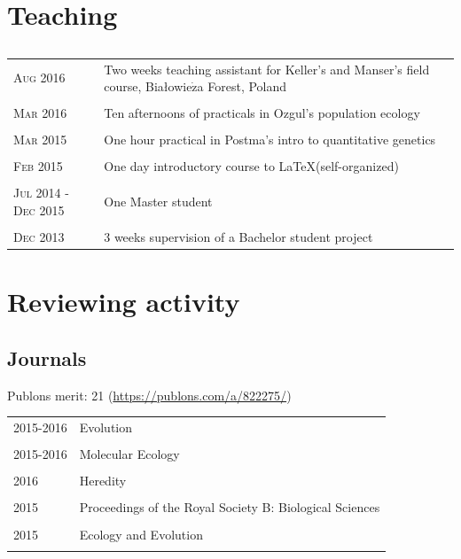 \documentclass[a4paper,10pt]{article} %
\begin{document}
\section*{Teaching}
\subsection*{}
\begin{tabular}{p{4cm}|p{11cm}}
\hfill \textsc{Aug 2016} & Two weeks teaching assistant for Keller's and Manser's field course, Bia{\l}owie$\dot{\mathrm{z}}$a Forest, Poland\\
\multicolumn{2}{c}{} \\
\hfill \textsc{Mar 2016} & Ten afternoons of practicals in Ozgul's population ecology \\
\multicolumn{2}{c}{} \\
\hfill \textsc{Mar 2015} & One hour practical in Postma's intro to quantitative genetics\\
\multicolumn{2}{c}{} \\
\hfill \textsc{Feb 2015} & One day introductory course to \LaTeX (self-organized)\\
\multicolumn{2}{c}{} \\
\hfill \textsc{Jul 2014 - Dec 2015} & One Master student\\
\multicolumn{2}{c}{} \\
\hfill \textsc{Dec 2013} & 3 weeks supervision of a Bachelor student project\\
\end{tabular}

\section*{Reviewing activity}
\subsection*{Journals}
Publons merit: 21 (\url{https://publons.com/a/822275/})
\begin{table}[h]
\begin{tabular}{p{4cm}|p{11cm}}
\hfill \textsc{2015-2016} & Evolution\\
\multicolumn{2}{c}{} \\
\hfill \textsc{2015-2016} & Molecular Ecology\\
\multicolumn{2}{c}{} \\
\hfill \textsc{2016} & Heredity\\
\multicolumn{2}{c}{} \\
\hfill \textsc{2015} & Proceedings of the Royal Society B: Biological Sciences\\
\multicolumn{2}{c}{} \\
\hfill \textsc{2015} & Ecology and Evolution\\
\multicolumn{2}{c}{} \\
\end{tabular}
\end{table}
\end{document}
